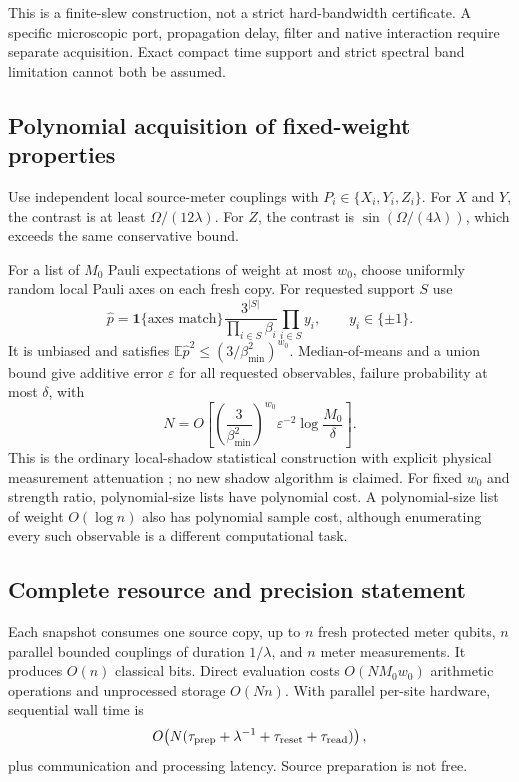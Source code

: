 \documentclass[11pt,a4paper]{article}
\begin{document}
This is a finite-slew construction, not a strict hard-bandwidth certificate. A specific microscopic port, propagation delay, filter and native interaction require separate acquisition. Exact compact time support and strict spectral band limitation cannot both be assumed.

\subsection{Polynomial acquisition of fixed-weight properties}
Use independent local source-meter couplings with $P_i\in\{X_i,Y_i,Z_i\}$. For $X$ and $Y$, the contrast is at least $\Omega/(12\lambda)$. For $Z$, the contrast is $\sin(\Omega/(4\lambda))$, which exceeds the same conservative bound.

For a list of $M_0$ Pauli expectations of weight at most $w_0$, choose uniformly random local Pauli axes on each fresh copy. For requested support $S$ use
\begin{equation}
\widehat p=\mathbf1\{\text{axes match}\}\frac{3^{|S|}}{\prod_{i\in S}\beta_i}\prod_{i\in S}y_i,
\qquad y_i\in\{\pm1\}.
\end{equation}
It is unbiased and satisfies $\mathbb E\widehat p^2\le(3/\beta_{\min}^2)^{w_0}$. Median-of-means and a union bound give additive error $\varepsilon$ for all requested observables, failure probability at most $\delta$, with
\begin{equation}
\boxed{N=O\!\left[\left(\frac3{\beta_{\min}^2}\right)^{w_0}\varepsilon^{-2}\log\frac{M_0}{\delta}\right].}
\label{eq:shadows}
\end{equation}
This is the ordinary local-shadow statistical construction with explicit physical measurement attenuation \cite{shadows}; no new shadow algorithm is claimed. For fixed $w_0$ and strength ratio, polynomial-size lists have polynomial cost. A polynomial-size list of weight $O(\log n)$ also has polynomial sample cost, although enumerating every such observable is a different computational task.

\subsection{Complete resource and precision statement}
Each snapshot consumes one source copy, up to $n$ fresh protected meter qubits, $n$ parallel bounded couplings of duration $1/\lambda$, and $n$ meter measurements. It produces $O(n)$ classical bits. Direct evaluation costs $O(NM_0w_0)$ arithmetic operations and unprocessed storage $O(Nn)$. With parallel per-site hardware, sequential wall time is
\begin{equation}
O\!\left(N(\tau_{\rm prep}+\lambda^{-1}+\tau_{\rm reset}+\tau_{\rm read})\right),
\end{equation}
plus communication and processing latency. Source preparation is not free.
\end{document}
